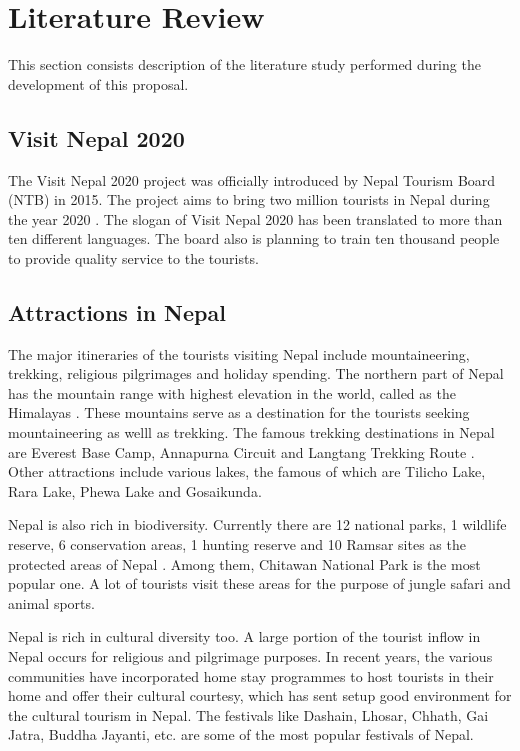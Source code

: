 \documentclass[12pt, a4paper, oneside]{article}
\begin{document}
\break
\section{Literature Review}
This section consists description of the literature study performed during the development of this proposal.

\subsection{Visit Nepal 2020}
The Visit Nepal 2020 project was officially introduced by Nepal Tourism Board (NTB) in 2015. The project aims to bring two million tourists in Nepal during the year 2020 \cite{visitnepal}. The slogan of Visit Nepal 2020 has been translated to more than ten different languages. The board also is planning to train ten thousand people to provide quality service to the tourists. 

\subsection{Attractions in Nepal}
The major itineraries of the tourists visiting Nepal include mountaineering, trekking, religious pilgrimages and holiday spending. The northern part of Nepal has the mountain range with highest elevation in the world, called as the Himalayas \cite{himalayas}. These mountains serve as a destination for the tourists seeking mountaineering as welll as trekking. The famous trekking destinations in Nepal are Everest Base Camp, Annapurna Circuit and Langtang Trekking Route \cite{trekkingroutes}. Other attractions include various lakes, the famous of which are Tilicho Lake, Rara Lake, Phewa Lake and Gosaikunda.

Nepal is also rich in biodiversity. Currently there are 12 national parks, 1 wildlife reserve, 6 conservation areas, 1 hunting reserve and 10 Ramsar sites as the protected areas of Nepal \cite{protectedareas}. Among them, Chitawan National Park is the most popular one. A lot of tourists visit these areas for the purpose of jungle safari and animal sports.

Nepal is rich in cultural diversity too. A large portion of the tourist inflow in Nepal occurs for religious and pilgrimage purposes. In recent years, the various communities have incorporated home stay programmes to host tourists in their home and offer their cultural courtesy, which has sent setup good environment for the cultural tourism in Nepal. The festivals like Dashain, Lhosar, Chhath, Gai Jatra, Buddha Jayanti, etc. are some of the most popular festivals of Nepal.
\end{document}
